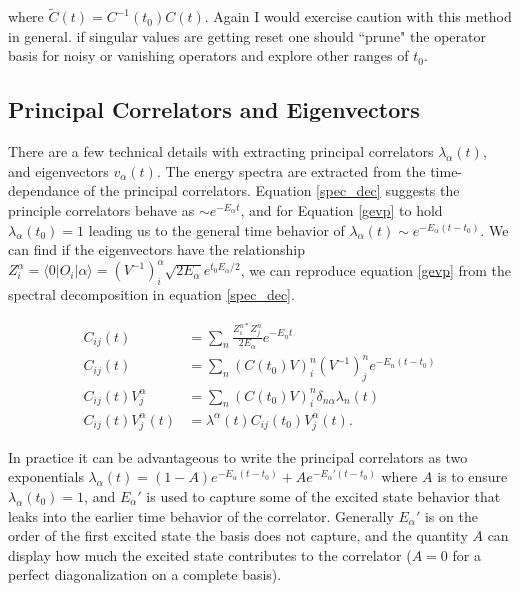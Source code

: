 \documentclass[onecolumn,article,preprintnumbers]{revtex4-1}
\begin{document}
where $\tilde{C}(t)=C^{-1}(t_0)C(t)$. Again I would exercise caution with this method in general. if singular values are getting reset one should ``prune" the operator basis for noisy or vanishing operators and explore other ranges of $t_0$.
\subsection{Principal Correlators and Eigenvectors}

There are a few technical details with extracting principal correlators $\lambda_{\alpha}(t)$, and eigenvectors $v_{\alpha}(t)$. The energy spectra are extracted from the time-dependance of the principal correlators. Equation \ref{spec_dec} suggests the principle correlators behave as $\sim e^{-E_{\alpha }t}$, and for Equation \ref{gevp} to hold $\lambda_{\alpha}(t_0)=1$ leading us to the general time behavior of $\lambda_{\alpha}(t)\sim e^{-E_{\alpha}(t-t_0)}$. We can find if the eigenvectors have the relationship $Z_i^{\alpha} = \langle 0|O_i|\alpha\rangle = \left(V^{-1}\right)^{\alpha}_i \sqrt{2E_{\alpha}}e^{t_0E_{\alpha}/2}$, we can reproduce equation \ref{gevp} from the spectral decomposition in equation \ref{spec_dec}.


\begin{align}
C_{ij}(t)&=\sum_{n}\frac{Z_i^{n*}Z_j^n}{2E_{\alpha}}e^{-E_nt} \\
C_{ij}(t)&=\sum_n \left(C(t_0)V\right)^{n}_i\left(V^{-1}\right)^n_j e^{-E_n(t-t_0)} \\
C_{ij}(t) V_j^{\alpha} & = \sum_n  \left(C(t_0)V\right)^{n}_i\delta_{n\alpha}\lambda_n(t) \\
C_{ij}(t) V_{j}^{\alpha}(t) & = \lambda^{\alpha}(t)C_{ij}(t_0)V^{\alpha}_{j}(t).
\end{align}

In practice it can be advantageous to write the principal correlators as two exponentials $\lambda_{\alpha}(t) = (1-A)e^{-E_{\alpha}(t-t_0)}+Ae^{-E_{\alpha}'(t-t_0)}$ where $A$ is to ensure $\lambda_{\alpha}(t_0)=1$, and $E_{\alpha}'$ is used to capture some of the excited state behavior that leaks into the earlier time behavior of the correlator. Generally $E_{\alpha}'$ is on the order of the first excited state the basis does not capture, and the quantity $A$ can display how much the excited state contributes to the correlator ($A=0$ for a perfect diagonalization on a complete basis).
\end{document}
